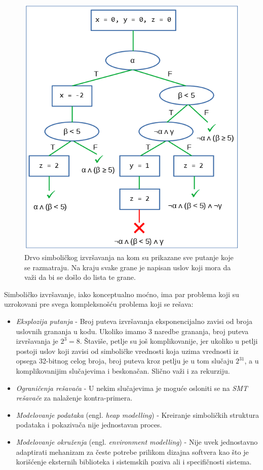 \begin{figure}[h!]
\centering
\includegraphics[scale=0.7]{images/sym_tree.png}
\caption{Drvo simboličkog izvršavanja na kom su prikazane sve putanje koje se razmatraju. Na kraju svake grane je napisan uslov koji mora da važi da bi se došlo do lista te grane.}
\label{fig:SymbolicExecTree}
\end{figure}

Simboličko izvršavanje, iako konceptualno moćno, ima par problema koji su uzrokovani pre svega kompleksnošću problema koji se rešava:
\begin{itemize}
    \item \emph{Eksplozija putanja} - Broj puteva izvršavanja eksponencijalno zavisi od broja uslovnih grananja u kodu. Ukoliko imamo 3 naredbe grananja, broj puteva izvršavanja je $2^3=8$. Štaviše, petlje su još komplikovanije, jer ukoliko u petlji postoji uslov koji zavisi od simboličke vrednosti koja uzima vrednosti iz opsega 32-bitnog celog broja, broj puteva kroz petlju je u tom slučaju $2^{31}$, a u komplikovanijim slučajevima i beskonačan. Slično važi i za rekurziju.
    \item \emph{Ograničenja rešavača} - U nekim slučajevima je moguće osloniti se na \emph{SMT rešavače} \cite{SMT} za nalaženje kontra-primera.
    \item \emph{Modelovanje podataka} (engl. \emph{heap modelling}) - Kreiranje simboličkih struktura podataka i pokazivača nije jednostavan proces.
    \item \emph{Modelovanje okruženja} (engl. \emph{environment modelling}) - Nije uvek jednostavno adaptirati mehanizam za česte potrebe prilikom dizajna softvera kao što je korišćenje eksternih biblioteka i sistemskih poziva ali i specifičnosti sistema.
\end{itemize}

